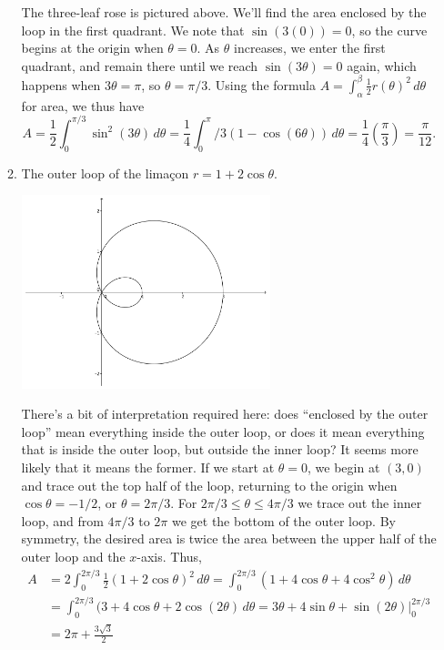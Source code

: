\documentclass[12pt]{article}
\newcommand{\di}{\displaystyle}
\begin{document}
\begin{enumerate}
\begin{enumerate}
The three-leaf rose is pictured above. We'll find the area enclosed by the loop in the first quadrant. We note that $\sin(3(0))=0$, so the curve begins at the origin when $\theta=0$. As $\theta$ increases, we enter the first quadrant, and remain there until we reach $\sin(3\theta)=0$ again, which happens when $3\theta = \pi$, so $\theta = \pi/3$. Using the formula $\di A = \int_\alpha^\beta \frac{1}{2}r(\theta)^2\,d\theta$ for area, we thus have
\[
 A = \frac{1}{2}\int_0^{\pi/3}\sin^2(3\theta)\,d\theta = \frac{1}{4}\int_0^\pi/3 (1-\cos(6\theta))\,d\theta = \frac{1}{4}(\frac{\pi}{3}) = \frac{\pi}{12}.
\]

 \item The outer loop of the lima{\c c}on $r=1+2\cos\theta$.

\begin{center}
 \includegraphics[width=0.6\textwidth]{WS6-4b}
\end{center}

There's a bit of interpretation required here: does ``enclosed by the outer loop'' mean everything inside the outer loop, or does it mean everything that is inside the outer loop, but outside the inner loop? It seems more likely that it means the former. If we start at $\theta = 0$, we begin at $(3,0)$ and trace out the top half of the loop, returning to the origin when $\cos\theta = -1/2$, or $\theta = 2\pi/3$. For $2\pi/3\leq \theta\leq 4\pi/3$ we trace out the inner loop, and from $4\pi/3$ to $2\pi$ we get the bottom of the outer loop. By symmetry, the desired area is twice the area between the upper half of the outer loop and the $x$-axis. Thus,
\begin{align*}
 A &= 2\int_0^{2\pi/3}\frac{1}{2}(1+2\cos\theta)^2\,d\theta = \int_0^{2\pi/3}(1+4\cos\theta+4\cos^2\theta)\,d\theta\\
& = \int_0^{2\pi/3}(3+4\cos\theta+2\cos(2\theta)\,d\theta = \left. 3\theta+4\sin\theta+\sin(2\theta)\right|_0^{2\pi/3}\\
& = 2\pi+\frac{3\sqrt{3}}{2}
\end{align*}


\end{enumerate}
\end{enumerate}
\end{document}
